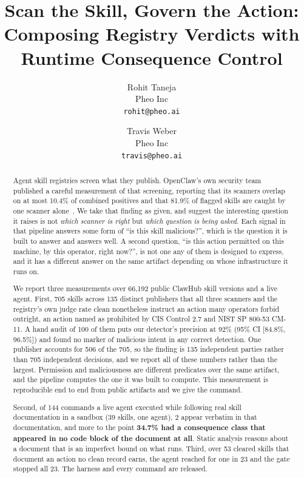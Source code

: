 \documentclass[10pt]{article}
\title{\textbf{Scan the Skill, Govern the Action:\\
Composing Registry Verdicts with Runtime Consequence Control}}
\author{
  Rohit Taneja\\ Pheo Inc\\ \texttt{rohit@pheo.ai}
  \and
  Travis Weber\\ Pheo Inc\\ \texttt{travis@pheo.ai}
}
\date{}
\begin{document}
\maketitle

\begin{abstract}
Agent skill registries screen what they publish. OpenClaw's own security team
published a careful measurement of that screening, reporting that its scanners
overlap on at most 10.4\% of combined positives and that 81.9\% of flagged skills are
caught by one scanner alone~\cite{clawhubsignals}. We take that finding as given, and
suggest the interesting question it raises is not \emph{which scanner is right} but
\emph{which question is being asked}. Each signal in that pipeline answers some form
of ``is this skill malicious?'', which is the question it is built to answer and
answers well. A second question, ``is this action permitted on this machine, by this
operator, right now?'', is not one any of them is designed to express, and it has a
different answer on the same artifact depending on whose infrastructure it runs on.

We report three measurements over 66,192 public ClawHub skill versions and a live
agent. First, 705 skills across 135 distinct publishers that all three scanners and
the registry's own judge rate clean nonetheless instruct an action many operators
forbid outright, an action named as prohibited by CIS Control 2.7 and NIST SP 800-53
CM-11. A hand audit of 100 of them puts our detector's precision at 92\% (95\% CI
[84.8\%, 96.5\%]) and found no marker of malicious intent in any correct detection.
One publisher accounts for 506 of the 705, so the finding is 135 independent parties
rather than 705 independent decisions, and we report all of these numbers rather than
the largest. Permission and maliciousness are different predicates over the same
artifact, and the pipeline computes the one it was built to compute. This measurement
is reproducible end to end from public artifacts and we give the command.

Second, of 144 commands a live agent executed while following real skill
documentation in a sandbox (39 skills, one agent), 2 appear verbatim in that
documentation, and more to the point \textbf{34.7\% had a consequence class that
appeared in no code block of the document at all}. Static analysis reasons about a
document that is an imperfect bound on what runs. Third, over 53 cleared skills that
document an action no clean record earns, the agent reached for one in 23 and the
gate stopped all 23. The harness and every command are released.


\end{abstract}
\end{document}

